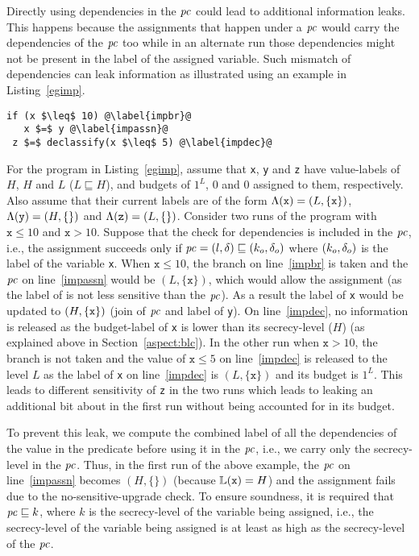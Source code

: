Directly using dependencies in the $\mathit{pc}$ could lead to
additional information leaks. This happens because the assignments
that happen under a $\mathit{pc}$ would carry the dependencies of
the $\mathit{pc}$ too while in an alternate run those dependencies might not
be present in the label of the assigned variable. Such mismatch of
dependencies can leak information as illustrated using an example in
Listing~\ref{egimp}.

\begin{lstlisting}[float,caption=Illustration of handling of
  implicit flows,label=egimp]
 if (x $\leq$ 10) @\label{impbr}@
   x $=$ y @\label{impassn}@
 z $=$ declassify(x $\leq$ 5) @\label{impdec}@
\end{lstlisting}

For the program in Listing~\ref{egimp}, assume that \texttt{x},
\texttt{y} and \texttt{z} have value-labels of $H$, $H$ and $L$ ($L
\sqsubseteq H$), and budgets of $1^L$, $0$ and $0$ assigned to them,
respectively. Also assume that their current labels are of the
form $\Lambda(\texttt{x}) = (L, \{\texttt{x}\})$, $\Lambda(\texttt{y}) = (H,
\{\})$ and $\Lambda(\texttt{z}) = (L, \{\})$. 
Consider two runs of the program with $\texttt{x} \leq 10$ and
$\texttt{x} > 10$. Suppose that the check for dependencies is included
in the $\mathit{pc}$, i.e., the assignment succeeds only if $\mathit{pc} = (l, \delta)
\sqsubseteq (k_o, \delta_o)$ where $(k_o, \delta_o)$ is the label of the
variable \texttt{x}.  When $\texttt{x} \leq 10$, the branch on
line~\ref{impbr} is taken and the $\mathit{pc}$ on line~\ref{impassn} would be
$(L, \{\texttt{x}\})$, which would allow the assignment (as the label 
of  is not less sensitive than the $\mathit{pc}$). As a result the label
of \texttt{x} would be updated to $(H, \{\texttt{x}\})$ (join of $\mathit{pc}$ and
label of \texttt{y}). On line~\ref{impdec}, no information is
released as the budget-label of \texttt{x} is lower than its
secrecy-level ($H$) (as explained above in
Section~\ref{aspect:blc}). In the other run when 
$\texttt{x} > 10$, the branch is not taken and the value of
$\texttt{x} \leq 5$ on line~\ref{impdec} is released to the level $L$
as the label of \texttt{x} on line~\ref{impdec} is $(L,
\{\texttt{x}\})$ and its budget is $1^L$. This leads to different
sensitivity of \texttt{z} in the two runs which leads to leaking an
additional bit about  in the first run without being accounted
for in its budget. 

To prevent this leak, we compute the combined label of all the
dependencies of the value in the predicate before using it in the
$\mathit{pc}$, i.e., we carry only the secrecy-level in the $\mathit{pc}$. Thus, in
the first run of the above example, the $\mathit{pc}$ on line~\ref{impassn}
becomes $(H, \{\})$ (because $\mathbb{L}(\texttt{x}) = H$) and the
assignment fails due to the no-sensitive-upgrade check. To ensure
soundness, it is required that $\mathit{pc} \sqsubseteq k$, where $k$ is the
secrecy-level of the variable being assigned, i.e., the secrecy-level
of the variable being assigned is at least as high as the
secrecy-level of the $\mathit{pc}$. 

